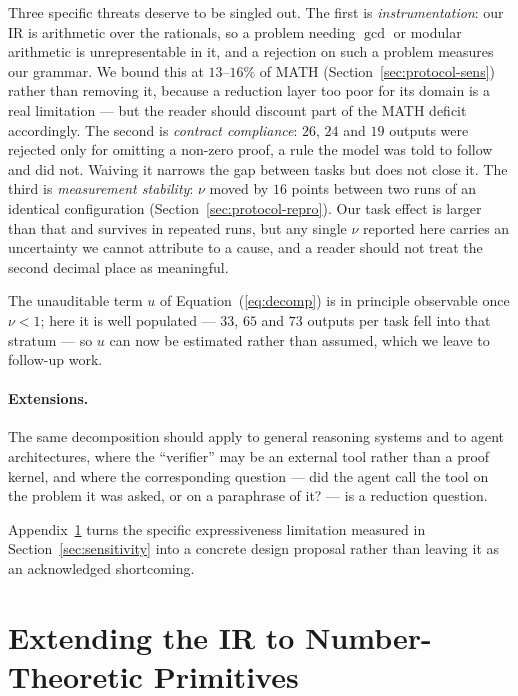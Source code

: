 \documentclass[11pt,a4paper]{article}
\begin{document}
Three specific threats deserve to be singled out.  The first is
\emph{instrumentation}: our IR is arithmetic over the rationals, so a problem
needing $\gcd$ or modular arithmetic is unrepresentable in it, and a rejection on
such a problem measures our grammar.  We bound this at $13$--$16\%$ of MATH
(Section~\ref{sec:protocol-sens}) rather than removing it, because a reduction
layer too poor for its domain is a real limitation --- but the reader should
discount part of the MATH deficit accordingly.  The second is \emph{contract
compliance}: $26$, $24$ and $19$ outputs were rejected only for omitting a
non-zero proof, a rule the model was told to follow and did not.  Waiving it
narrows the gap between tasks but does not close it.  The third is
\emph{measurement stability}: $\nu$ moved by $16$ points between two runs of an
identical configuration (Section~\ref{sec:protocol-repro}).  Our task effect is
larger than that and survives in repeated runs, but any single $\nu$ reported
here carries an uncertainty we cannot attribute to a cause, and a reader should
not treat the second decimal place as meaningful.

The unauditable term $u$ of Equation~(\ref{eq:decomp}) is in principle observable
once $\nu < 1$; here it is well populated --- $33$, $65$ and $73$ outputs per
task fell into that stratum --- so $u$ can now be estimated rather than assumed,
which we leave to follow-up work.

\paragraph{Extensions.}
The same decomposition should apply to general reasoning systems and to agent
architectures, where the ``verifier'' may be an external tool rather than a
proof kernel, and where the corresponding question --- did the agent call the
tool on the problem it was asked, or on a paraphrase of it? --- is a reduction
question.

Appendix~\ref{app:extension} turns the specific expressiveness limitation
measured in Section~\ref{sec:sensitivity} into a concrete design proposal rather
than leaving it as an acknowledged shortcoming.

\appendix
\section{Extending the IR to Number-Theoretic Primitives}
\label{app:extension}
\end{document}
